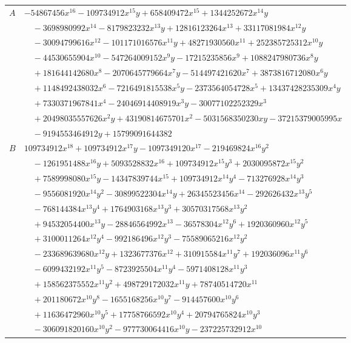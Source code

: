 \documentclass[11pt]{article}
\begin{document}
\begin{longtable}{@{}ll@{}}
$A$ & $-54867456x^{16}-109734912x^{15}y+658409472x^{15}+1344252672x^{14}y$\\
 & $\quad -3698980992x^{14}-8179823232x^{13}y+12816123264x^{13}+33117081984x^{12}y$\\
 & $\quad -30094799616x^{12}-101171016576x^{11}y+48271930560x^{11}+252385725312x^{10}y$\\
 & $\quad -44530655904x^{10}-547264009152x^{9}y-17215235856x^{9}+1088247980736x^{8}y$\\
 & $\quad +181644142680x^{8}-2070645779664x^{7}y-514497421620x^{7}+3873816712080x^{6}y$\\
 & $\quad +1148492438032x^{6}-7216491815538x^{5}y-2373564054728x^{5}+13437428235309x^{4}y$\\
 & $\quad +7330371967841x^{4}-24046914408919x^{3}y-30077102252329x^{3}$\\
 & $\quad +20498035557626x^{2}y+43190814675701x^{2}-5031568350230xy-37215379005995x$\\
 & $\quad -9194553464912y+15799091644382$\\
$B$ & $109734912x^{18}+109734912x^{17}y-1097349120x^{17}-219469824x^{16}y^{2}$\\
 & $\quad -1261951488x^{16}y+5093528832x^{16}+109734912x^{15}y^{3}+2030095872x^{15}y^{2}$\\
 & $\quad +7589998080x^{15}y-14347839744x^{15}+109734912x^{14}y^{4}-713276928x^{14}y^{3}$\\
 & $\quad -9556081920x^{14}y^{2}-30899522304x^{14}y+26345523456x^{14}-292626432x^{13}y^{5}$\\
 & $\quad -768144384x^{13}y^{4}+1764903168x^{13}y^{3}+30570317568x^{13}y^{2}$\\
 & $\quad +94532054400x^{13}y-28846564992x^{13}-36578304x^{12}y^{6}+1920360960x^{12}y^{5}$\\
 & $\quad +3100011264x^{12}y^{4}-992186496x^{12}y^{3}-75589065216x^{12}y^{2}$\\
 & $\quad -233689639680x^{12}y+1323677376x^{12}+310915584x^{11}y^{7}+192036096x^{11}y^{6}$\\
 & $\quad -6099432192x^{11}y^{5}-8723925504x^{11}y^{4}-5971408128x^{11}y^{3}$\\
 & $\quad +158562375552x^{11}y^{2}+498729172032x^{11}y+78740514720x^{11}$\\
 & $\quad +201180672x^{10}y^{8}-1655168256x^{10}y^{7}-914457600x^{10}y^{6}$\\
 & $\quad +11636472960x^{10}y^{5}+17758766592x^{10}y^{4}+20794765824x^{10}y^{3}$\\
 & $\quad -306091820160x^{10}y^{2}-977730064416x^{10}y-237225732912x^{10}$\\

\end{longtable}
\end{document}

